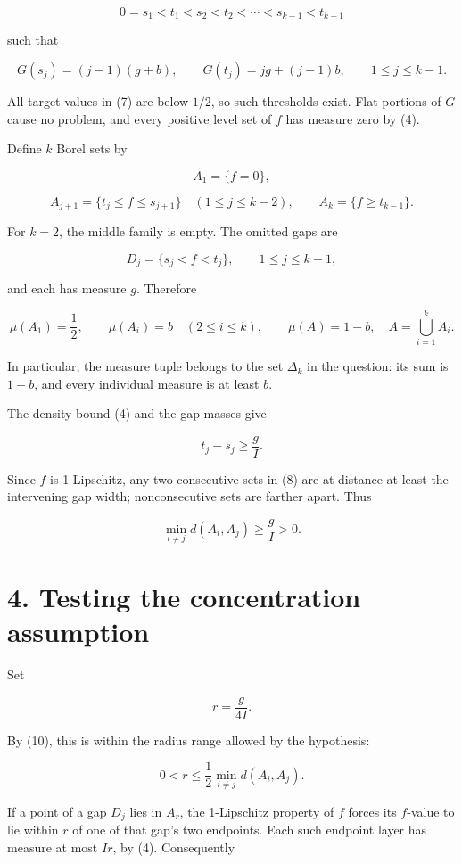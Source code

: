 \documentclass[11pt,a4paper]{article}
\begin{document}
\[
0=s_1<t_1<s_2<t_2<\cdots<s_{k-1}<t_{k-1}
\]

such that

\[
G(s_j)=(j-1)(g+b),
\qquad
G(t_j)=jg+(j-1)b,
\qquad 1\leq j\leq k-1.
\tag{7}
\]

All target values in (7) are below \(1/2\), so such thresholds exist.
Flat portions of \(G\) cause no problem, and every positive level set of
\(f\) has measure zero by (4).

Define \(k\) Borel sets by

\[
A_1=\{f=0\},
\]

\[
A_{j+1}=\{t_j\leq f\leq s_{j+1}\}
\quad(1\leq j\leq k-2),
\qquad
A_k=\{f\geq t_{k-1}\}.
\tag{8}
\]

For \(k=2\), the middle family is empty. The omitted gaps are

\[
D_j=\{s_j<f<t_j\},
\qquad 1\leq j\leq k-1,
\]

and each has measure \(g\). Therefore

\[
\mu(A_1)=\frac12,
\qquad
\mu(A_i)=b\quad(2\leq i\leq k),
\qquad
\mu(A)=1-b,
\quad A=\bigcup_{i=1}^kA_i.
\tag{9}
\]

In particular, the measure tuple belongs to the set \(\Delta_k\) in the
question: its sum is \(1-b\), and every individual measure is at least
\(b\).

The density bound (4) and the gap masses give

\[
t_j-s_j\geq\frac{g}{I}.
\]

Since \(f\) is 1-Lipschitz, any two consecutive sets in (8) are at
distance at least the intervening gap width; nonconsecutive sets are
farther apart. Thus

\[
\min_{i\ne j}d(A_i,A_j)\geq\frac{g}{I}>0.
\tag{10}
\]

\hypertarget{1013-testing-the-concentration-assumption}{%
\section{4. Testing the concentration
assumption}\label{1013-testing-the-concentration-assumption}}

Set

\[
r=\frac{g}{4I}.
\tag{11}
\]

By (10), this is within the radius range allowed by the hypothesis:

\[
0<r\leq\frac12\min_{i\ne j}d(A_i,A_j).
\]

If a point of a gap \(D_j\) lies in \(A_r\), the 1-Lipschitz property of
\(f\) forces its \(f\)-value to lie within \(r\) of one of that gap's
two endpoints. Each such endpoint layer has measure at most \(Ir\), by
(4). Consequently
\end{document}
